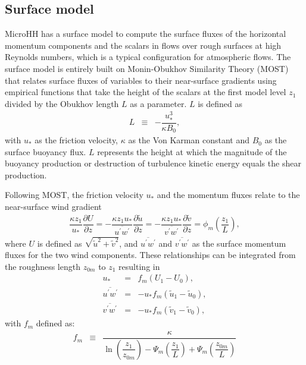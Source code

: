 \documentclass[gmd]{copernicus}
\newcommand{\uf}{\ensuremath{\widetilde{u}}}
\newcommand{\vf}{\ensuremath{\widetilde{v}}}
\begin{document}
\subsection{Surface model}\label{sec:surface_model}
MicroHH has a surface model to compute the surface fluxes of the horizontal momentum components and the scalars in flows over rough surfaces at high Reynolds numbers, which is a typical configuration for atmospheric flows. The surface model is entirely built on Monin-Obukhov Similarity Theory (MOST) that relates surface fluxes of variables to their near-surface gradients using empirical functions that take the height of the scalars at the first model level $z_1$ divided by the Obukhov length $L$ as a parameter. $L$ is defined as
\begin{eqnarray}
L   & \equiv & - \dfrac{u_*^3}{\kappa B_0},
\end{eqnarray}
with $u_*$ as the friction velocity, $\kappa$ as the Von Karman constant and $B_0$ as the surface buoyancy flux. $L$ represents the height at which the magnitude of the buoyancy production or destruction of turbulence kinetic energy equals the shear production.

Following MOST, the friction velocity $u_*$ and the momentum fluxes relate to the near-surface wind gradient
\begin{eqnarray}
\dfrac{\kappa z_1}{u_*} \dfrac{\partial U}{\partial z}  = 
- \dfrac{\kappa z_1 u_*}{\overline{u^\prime w^\prime}} \dfrac{\partial \uf}{\partial z} =
- \dfrac{\kappa z_1 u_*}{\overline{v^\prime w^\prime}} \dfrac{\partial \vf}{\partial z} =
\phi_m \left( \dfrac{z_1}{L} \right),\label{eq:surf_grad}
\end{eqnarray}
where $U$ is defined as $\sqrt{\uf^2 + \vf^2}$, and $\overline{u^\prime w^\prime}$ and $\overline{v^\prime w^\prime}$ as the surface momentum fluxes for the two wind components. These relationships can be integrated from the roughness length $z_{0m}$ to $z_1$ resulting in 
\begin{eqnarray}
u_* & =  & f_m \left( U_1 - U_0 \right),\\
\overline{u^\prime w^\prime} & = & - u_* f_m \left( \uf_1 - \uf_0 \right),\\
\overline{v^\prime w^\prime} & = & - u_* f_m \left( \vf_1 - \vf_0 \right),
\end{eqnarray}
with $f_m$ defined as:
\begin{eqnarray}
f_m & \equiv & \dfrac{\kappa}
{ \ln{\left( \dfrac{z_1}{z_{0m}} \right)}
	- \varPsi_m \left( \dfrac{z_1}{L} \right)
	+ \varPsi_m \left( \dfrac{z_{0m}}{L} \right) }
\end{eqnarray}
\end{document}
